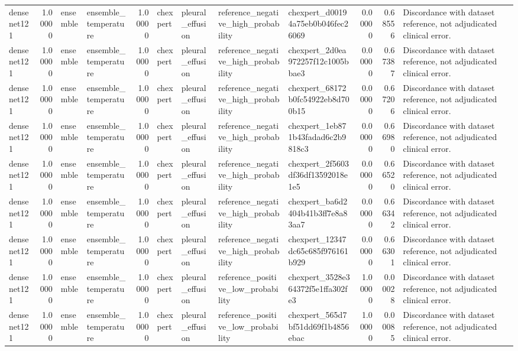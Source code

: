 \begin{tabular}{lrllrllllrrl}
densenet121 & 1.00000 & ensemble & ensemble\_temperature & 1.00000 & chexpert & pleural\_effusion & reference\_negative\_high\_probability & chexpert\_d00194a75eb0b046fec26069 & 0.00000 & 0.68556 & Discordance with dataset reference, not adjudicated clinical error. \\
densenet121 & 1.00000 & ensemble & ensemble\_temperature & 1.00000 & chexpert & pleural\_effusion & reference\_negative\_high\_probability & chexpert\_2d0ea972257f12c1005bbae3 & 0.00000 & 0.67387 & Discordance with dataset reference, not adjudicated clinical error. \\
densenet121 & 1.00000 & ensemble & ensemble\_temperature & 1.00000 & chexpert & pleural\_effusion & reference\_negative\_high\_probability & chexpert\_68172b0fc54922eb8d700b15 & 0.00000 & 0.67206 & Discordance with dataset reference, not adjudicated clinical error. \\
densenet121 & 1.00000 & ensemble & ensemble\_temperature & 1.00000 & chexpert & pleural\_effusion & reference\_negative\_high\_probability & chexpert\_1eb871b43fadad6c2b9818c3 & 0.00000 & 0.66980 & Discordance with dataset reference, not adjudicated clinical error. \\
densenet121 & 1.00000 & ensemble & ensemble\_temperature & 1.00000 & chexpert & pleural\_effusion & reference\_negative\_high\_probability & chexpert\_2f5603df36df13592018e1e5 & 0.00000 & 0.66520 & Discordance with dataset reference, not adjudicated clinical error. \\
densenet121 & 1.00000 & ensemble & ensemble\_temperature & 1.00000 & chexpert & pleural\_effusion & reference\_negative\_high\_probability & chexpert\_ba6d2404b41b3ff7e8a83aa7 & 0.00000 & 0.66342 & Discordance with dataset reference, not adjudicated clinical error. \\
densenet121 & 1.00000 & ensemble & ensemble\_temperature & 1.00000 & chexpert & pleural\_effusion & reference\_negative\_high\_probability & chexpert\_12347dc65c685f976161b929 & 0.00000 & 0.66301 & Discordance with dataset reference, not adjudicated clinical error. \\
densenet121 & 1.00000 & ensemble & ensemble\_temperature & 1.00000 & chexpert & pleural\_effusion & reference\_positive\_low\_probability & chexpert\_3528e364372f5e1ffa302fe3 & 1.00000 & 0.00028 & Discordance with dataset reference, not adjudicated clinical error. \\
densenet121 & 1.00000 & ensemble & ensemble\_temperature & 1.00000 & chexpert & pleural\_effusion & reference\_positive\_low\_probability & chexpert\_565d7bf51dd69f1b4856ebac & 1.00000 & 0.00085 & Discordance with dataset reference, not adjudicated clinical error. \\

\end{tabular}
